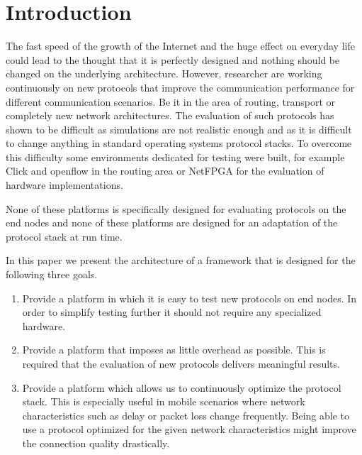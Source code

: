 \documentclass{sig-alternate}
\begin{document}



\section{Introduction}

The fast speed of the growth of the Internet and the huge effect on everyday life could lead to the thought that it is perfectly designed and nothing should be changed on the underlying architecture. However, researcher are working continuously on new protocols that improve the communication performance for different communication scenarios. Be it in the area of routing, transport or completely new network architectures. The evaluation of such protocols has shown to be difficult as simulations are not realistic enough and as it is difficult to change anything in standard operating systems protocol stacks. To overcome this difficulty some environments dedicated for testing were built, for example Click \cite{click} and openflow \cite{openflow} in the routing area or NetFPGA \cite{netFPGA} for the evaluation of hardware implementations. 

None of these platforms is specifically designed for evaluating protocols on the end nodes and none of these platforms are designed for an adaptation of the protocol stack at run time. 

In this paper we present the architecture of a framework that is designed for the following three goals. 
\begin{enumerate}
\item Provide a platform in which it is easy to test new protocols on end nodes. In order to simplify testing further it should not require any specialized hardware. 
\item Provide a platform that imposes as little overhead as possible. This is required that the evaluation of new protocols delivers meaningful results. 
\item Provide a platform which allows us to continuously optimize the protocol stack. This is especially useful in mobile scenarios where network characteristics such as delay or packet loss change frequently. Being able to use a protocol optimized for the given network characteristics might improve the connection quality drastically.
\end{enumerate}
\end{document}
